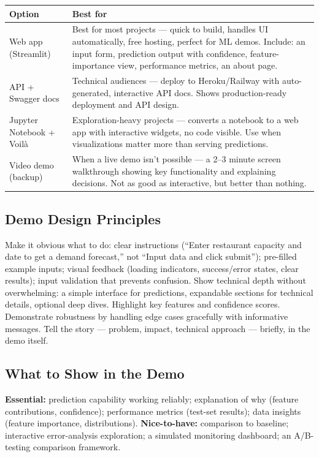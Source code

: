 \begin{longtable}{p{} p{}}
\toprule
\textbf{Option} & \textbf{Best for} \\
\midrule
\endhead
Web app (Streamlit) & Best for most projects --- quick to build, handles UI automatically, free hosting, perfect
for ML demos. Include: an input form, prediction output with confidence, feature-importance view, performance
metrics, an about page. \\
API + Swagger docs & Technical audiences --- deploy to Heroku/Railway with auto-generated, interactive API docs.
Shows production-ready deployment and API design. \\
Jupyter Notebook + Voil\`a & Exploration-heavy projects --- converts a notebook to a web app with interactive
widgets, no code visible. Use when visualizations matter more than serving predictions. \\
Video demo (backup) & When a live demo isn't possible --- a 2--3 minute screen walkthrough showing key
functionality and explaining decisions. Not as good as interactive, but better than nothing. \\
\bottomrule
\end{longtable}

\subsection{Demo Design Principles}

Make it obvious what to do: clear instructions (``Enter restaurant capacity and date to get a demand forecast,''
not ``Input data and click submit''); pre-filled example inputs; visual feedback (loading indicators,
success/error states, clear results); input validation that prevents confusion. Show technical depth without
overwhelming: a simple interface for predictions, expandable sections for technical details, optional deep dives.
Highlight key features and confidence scores. Demonstrate robustness by handling edge cases gracefully with
informative messages. Tell the story --- problem, impact, technical approach --- briefly, in the demo itself.

\subsection{What to Show in the Demo}

\textbf{Essential:} prediction capability working reliably; explanation of why (feature contributions,
confidence); performance metrics (test-set results); data insights (feature importance, distributions).
\textbf{Nice-to-have:} comparison to baseline; interactive error-analysis exploration; a simulated monitoring
dashboard; an A/B-testing comparison framework.

